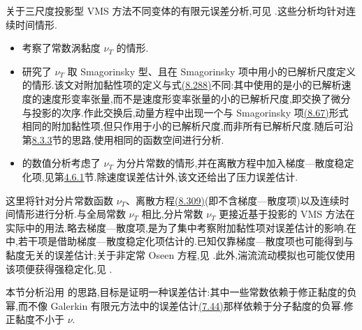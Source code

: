 \begin{note}[文献中的有限元误差分析]
\label{note:vms-coarse-projection-error-analysis-literature}
关于三尺度投影型 VMS 方法不同变体的有限元误差分析,可见 \textcite{JohnKaya2008,JohnKayaKindl2008,RoeheLube2010}.这些分析均针对连续时间情形.
\begin{itemize}
 \item \textcite{JohnKaya2008} 考察了常数涡黏度 $\nu_T$ 的情形.
 \item \textcite{JohnKayaKindl2008} 研究了 $\nu_T$ 取 Smagorinsky 型、且在 Smagorinsky 项中用小的已解析尺度定义的情形.该文对附加黏性项的定义与式\hyperref[eq:vms-coarse-projection-three-scale-method]{(8.288)}不同:其中使用的是小的已解析速度的速度形变率张量,而不是速度形变率张量的小的已解析尺度,即交换了微分与投影的次序.作此交换后,动量方程中出现一个与 Smagorinsky 项\hyperref[eq:smagorinsky-filter-width]{(8.67)}形式相同的附加黏性项,但只作用于小的已解析尺度,而非所有已解析尺度.随后可沿第\hyperref[subsec:smagorinsky-existence-uniqueness]{8.3.3}节的思路,使用相同的函数空间进行分析.
 \item \textcite{RoeheLube2010} 的数值分析考虑了 $\nu_T$ 为分片常数的情形,并在离散方程中加入梯度—散度稳定化项,见第\hyperref[sec:stokes-grad-div-stabilization]{4.6.1}节.除速度误差估计外,该文还给出了压力误差估计.
\end{itemize}
\end{note}

\begin{note}[分析中的涡黏度与分析目标]
\label{note:vms-coarse-projection-analysis-goal}
这里将针对分片常数函数 $\nu_T$、离散方程\hyperref[eq:vms-coarse-projection-discrete-method]{(8.309)}(即不含梯度—散度项)以及连续时间情形进行分析.与全局常数 $\nu_T$ 相比,分片常数 $\nu_T$ 更接近基于投影的 VMS 方法在实际中的用法.略去梯度—散度项,是为了集中考察附加黏性项对误差估计的影响.在 \textcite{RoeheLube2010} 中,若干项是借助梯度—散度稳定化项估计的.已知仅靠梯度—散度项也可能得到与黏度无关的误差估计;关于非定常 Oseen 方程,见 \textcite{deFrutos2016b}.此外,湍流流动模拟也可能仅使用该项便获得强稳定化,见 \textcite{JohnKindl2010a}.

本节分析沿用 \textcite{JohnKaya2008,RoeheLube2010} 的思路,目标是证明一种误差估计:其中一些常数依赖于修正黏度的负幂,而不像 Galerkin 有限元方法中的误差估计\hyperref[eq:time-dependent-fem-velocity-error]{(7.44)}那样依赖于分子黏度的负幂.修正黏度不小于 $\nu$.
\end{note}

